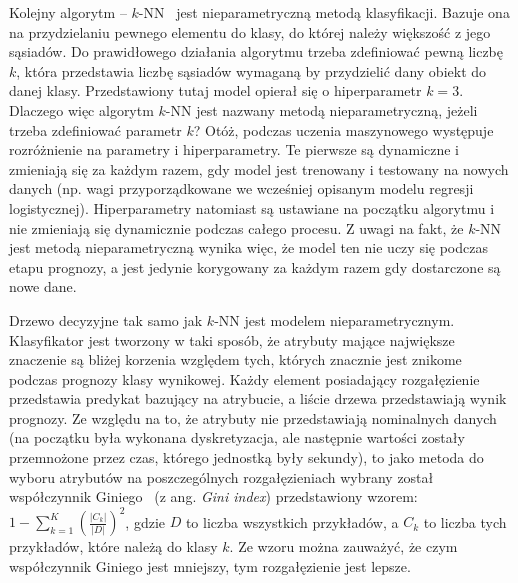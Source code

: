 \documentclass[a4paper,twoside,12pt]{book}
\newcommand{\obcy}[1]{\emph{#1}}
\newcommand{\ang}[1]{{\selectlanguage{british}\obcy{#1}}}
\begin{document}
Kolejny algorytm -- $k$-NN~\cite{knn} jest nieparametryczną metodą klasyfikacji. Bazuje ona na przydzielaniu pewnego elementu do klasy, do której należy większość z jego sąsiadów. Do prawidłowego działania algorytmu trzeba zdefiniować pewną liczbę $k$, która przedstawia liczbę sąsiadów wymaganą by przydzielić dany obiekt do danej klasy. Przedstawiony tutaj model opierał się o hiperparametr $k=3$. Dlaczego więc algorytm $k$-NN jest nazwany metodą nieparametryczną, jeżeli trzeba zdefiniować parametr $ k $? Otóż, podczas uczenia maszynowego występuje rozróżnienie na parametry i hiperparametry. Te pierwsze są dynamiczne i zmieniają się za każdym razem, gdy model jest trenowany i testowany na nowych danych (np. wagi przyporządkowane we wcześniej opisanym modelu regresji logistycznej). Hiperparametry natomiast są ustawiane na początku algorytmu i nie zmieniają się dynamicznie podczas całego procesu. Z uwagi na fakt, że $k$-NN jest metodą nieparametryczną wynika więc, że model ten nie uczy się podczas etapu prognozy, a jest jedynie korygowany za każdym razem gdy dostarczone są nowe dane. 

Drzewo decyzyjne tak samo jak $k$-NN jest modelem nieparametrycznym. Klasyfikator jest tworzony w taki sposób, że atrybuty mające największe znaczenie są bliżej korzenia względem tych, których znacznie jest znikome podczas prognozy klasy wynikowej. Każdy element posiadający rozgałęzienie przedstawia predykat bazujący na atrybucie, a liście drzewa przedstawiają wynik prognozy. Ze względu na to, że atrybuty nie przedstawiają nominalnych danych (na początku była wykonana dyskretyzacja, ale następnie wartości zostały przemnożone przez czas, którego jednostką były sekundy), to jako metoda do wyboru atrybutów na poszczególnych rozgałęzieniach wybrany został współczynnik Giniego~\cite{gini} (z ang. \ang{Gini index}) przedstawiony wzorem:
$
1-\sum_{k=1}^{K}\left ( \frac{\left | C_{k} \right |}{\left | D \right |} \right )^{2}
$, gdzie $ D $ to liczba wszystkich przykładów, a $ C_{k} $ to liczba tych przykładów, które należą do klasy $ k $. Ze wzoru można zauważyć, że czym współczynnik Giniego jest mniejszy, tym rozgałęzienie jest lepsze. 
\end{document}
